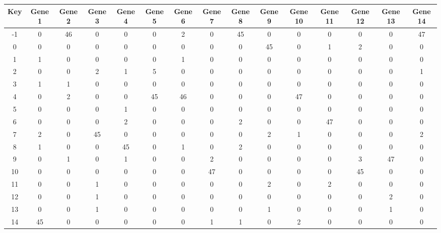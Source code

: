 \begin{tabular}{|c|c|c|c|c|c|c|c|c|c|c|c|c|c|c|}
\hline
Key & Gene 1 & Gene 2 & Gene 3 & Gene 4 & Gene 5 & Gene 6 & Gene 7 & Gene 8 & Gene 9 & Gene 10 & Gene 11 & Gene 12 & Gene 13 & Gene 14 \\
\hline
-1 & 0 & 46 & 0 & 0 & 0 & 2 & 0 & 45 & 0 & 0 & 0 & 0 & 0 & 47 \\
0 & 0 & 0 & 0 & 0 & 0 & 0 & 0 & 0 & 45 & 0 & 1 & 2 & 0 & 0 \\
1 & 1 & 0 & 0 & 0 & 0 & 1 & 0 & 0 & 0 & 0 & 0 & 0 & 0 & 0 \\
2 & 0 & 0 & 2 & 1 & 5 & 0 & 0 & 0 & 0 & 0 & 0 & 0 & 0 & 1 \\
3 & 1 & 1 & 0 & 0 & 0 & 0 & 0 & 0 & 0 & 0 & 0 & 0 & 0 & 0 \\
4 & 0 & 2 & 0 & 0 & 45 & 46 & 0 & 0 & 0 & 47 & 0 & 0 & 0 & 0 \\
5 & 0 & 0 & 0 & 1 & 0 & 0 & 0 & 0 & 0 & 0 & 0 & 0 & 0 & 0 \\
6 & 0 & 0 & 0 & 2 & 0 & 0 & 0 & 2 & 0 & 0 & 47 & 0 & 0 & 0 \\
7 & 2 & 0 & 45 & 0 & 0 & 0 & 0 & 0 & 2 & 1 & 0 & 0 & 0 & 2 \\
8 & 1 & 0 & 0 & 45 & 0 & 1 & 0 & 2 & 0 & 0 & 0 & 0 & 0 & 0 \\
9 & 0 & 1 & 0 & 1 & 0 & 0 & 2 & 0 & 0 & 0 & 0 & 3 & 47 & 0 \\
10 & 0 & 0 & 0 & 0 & 0 & 0 & 47 & 0 & 0 & 0 & 0 & 45 & 0 & 0 \\
11 & 0 & 0 & 1 & 0 & 0 & 0 & 0 & 0 & 2 & 0 & 2 & 0 & 0 & 0 \\
12 & 0 & 0 & 1 & 0 & 0 & 0 & 0 & 0 & 0 & 0 & 0 & 0 & 2 & 0 \\
13 & 0 & 0 & 1 & 0 & 0 & 0 & 0 & 0 & 1 & 0 & 0 & 0 & 1 & 0 \\
14 & 45 & 0 & 0 & 0 & 0 & 0 & 1 & 1 & 0 & 2 & 0 & 0 & 0 & 0 \\
\hline
\end{tabular}